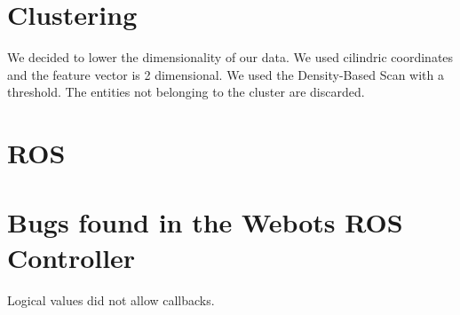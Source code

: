 \documentclass[a4paper]{article}
\begin{document}
	\section{Clustering}
	We decided to lower the dimensionality of our data. We used cilindric coordinates and the feature vector is 2 dimensional.
	We used the Density-Based Scan with a threshold. The entities not belonging to the cluster are discarded.
	
	\section{ROS}
	
	\section{Bugs found in the Webots ROS Controller}
	Logical values did not allow callbacks.
	
\end{document}
